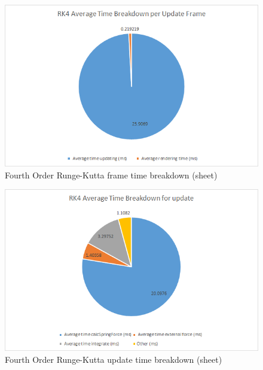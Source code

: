     \begin{figure}
    \begin{center}
      \includegraphics[scale=.9]{Figures/sheet_rk4_ft}
    \end{center}
    \caption{Fourth Order Runge-Kutta frame time breakdown (sheet)}
    \label{fig:rk4 ft sheet}
  \end{figure}
  
    \begin{figure}
    \begin{center}
      \includegraphics[scale=.9]{Figures/sheet_rk4_ut}
    \end{center}
    \caption{Fourth Order Runge-Kutta update time breakdown (sheet)}
    \label{fig:rk4 ut sheet}
  \end{figure}

